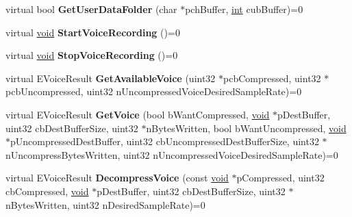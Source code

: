 \begin{DoxyCompactItemize}
\item 
\hypertarget{classISteamUser_ad9338e70287a15571c8ffc998e49d338}{}virtual bool {\bfseries Get\+User\+Data\+Folder} (char $\ast$pch\+Buffer, \hyperlink{SDL__thread_8h_a6a64f9be4433e4de6e2f2f548cf3c08e}{int} cub\+Buffer)=0\label{classISteamUser_ad9338e70287a15571c8ffc998e49d338}

\item 
\hypertarget{classISteamUser_a7f2e7fa09cf2fc1da25ff8601b917978}{}virtual \hyperlink{SDL__audio_8h_a52835ae37c4bb905b903cbaf5d04b05f}{void} {\bfseries Start\+Voice\+Recording} ()=0\label{classISteamUser_a7f2e7fa09cf2fc1da25ff8601b917978}

\item 
\hypertarget{classISteamUser_a8c66f7f9a4b5c81ae16e1db7be286bff}{}virtual \hyperlink{SDL__audio_8h_a52835ae37c4bb905b903cbaf5d04b05f}{void} {\bfseries Stop\+Voice\+Recording} ()=0\label{classISteamUser_a8c66f7f9a4b5c81ae16e1db7be286bff}

\item 
\hypertarget{classISteamUser_ac8b5ce5ab977e11631f1865e116f7def}{}virtual E\+Voice\+Result {\bfseries Get\+Available\+Voice} (uint32 $\ast$pcb\+Compressed, uint32 $\ast$pcb\+Uncompressed, uint32 n\+Uncompressed\+Voice\+Desired\+Sample\+Rate)=0\label{classISteamUser_ac8b5ce5ab977e11631f1865e116f7def}

\item 
\hypertarget{classISteamUser_a250ed50e33e6f8ae39229e0e1f440e1b}{}virtual E\+Voice\+Result {\bfseries Get\+Voice} (bool b\+Want\+Compressed, \hyperlink{SDL__audio_8h_a52835ae37c4bb905b903cbaf5d04b05f}{void} $\ast$p\+Dest\+Buffer, uint32 cb\+Dest\+Buffer\+Size, uint32 $\ast$n\+Bytes\+Written, bool b\+Want\+Uncompressed, \hyperlink{SDL__audio_8h_a52835ae37c4bb905b903cbaf5d04b05f}{void} $\ast$p\+Uncompressed\+Dest\+Buffer, uint32 cb\+Uncompressed\+Dest\+Buffer\+Size, uint32 $\ast$n\+Uncompress\+Bytes\+Written, uint32 n\+Uncompressed\+Voice\+Desired\+Sample\+Rate)=0\label{classISteamUser_a250ed50e33e6f8ae39229e0e1f440e1b}

\item 
\hypertarget{classISteamUser_ae351f90e7f95f945baeef5d7cf7c6760}{}virtual E\+Voice\+Result {\bfseries Decompress\+Voice} (const \hyperlink{SDL__audio_8h_a52835ae37c4bb905b903cbaf5d04b05f}{void} $\ast$p\+Compressed, uint32 cb\+Compressed, \hyperlink{SDL__audio_8h_a52835ae37c4bb905b903cbaf5d04b05f}{void} $\ast$p\+Dest\+Buffer, uint32 cb\+Dest\+Buffer\+Size, uint32 $\ast$n\+Bytes\+Written, uint32 n\+Desired\+Sample\+Rate)=0\label{classISteamUser_ae351f90e7f95f945baeef5d7cf7c6760}


\end{DoxyCompactItemize}
